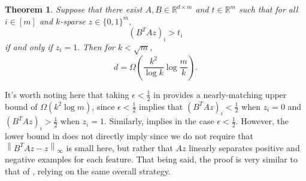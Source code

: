 \documentclass[11pt]{article}
\newtheorem{theorem}{Theorem}
\newcommand{\RR}{\mathbb{R}}
\newcommand{\norm}[1]{\left\|#1\right\|}
\begin{document}
\begin{theorem}\label{thm:threshold}
    Suppose that there exist $A,B \in \RR^{d\times m}$ and $t\in \RR^m$ such that for all $i\in [m]$ and $k$-sparse $z\in \{0,1\}^m$,
    \begin{equation}\label{eq:pineapple}
        (B^TAz)_i > t_i
    \end{equation}
    if and only if $z_i=1.$ Then for $k < \sqrt{m}$,
    \begin{equation}
        d = \Omega\left(\frac{k^2}{\log k}\log\frac{m}{k}\right).
    \end{equation}
\end{theorem}
It's worth noting here that taking $\epsilon < \frac{1}{2}$ in  provides a nearly-matching upper bound of $\Omega(k^2\log m)$, since $\epsilon < \frac{1}{2}$ implies that $(B^TAz)_i < \frac{1}{2}$ when $z_i = 0$ and $(B^TAz)_i > \frac{1}{2}$ when $z_i = 1$. Similarly,  implies  in the case $\epsilon < \frac{1}{2}$. However, the lower bound in  does not directly imply  since we do not require that $\norm{B^TAz - z}_\infty$ is small here, but rather that $Az$ linearly separates positive and negative examples for each feature. That being said, the proof is very similar to that of , relying on the same overall strategy.
\end{document}
